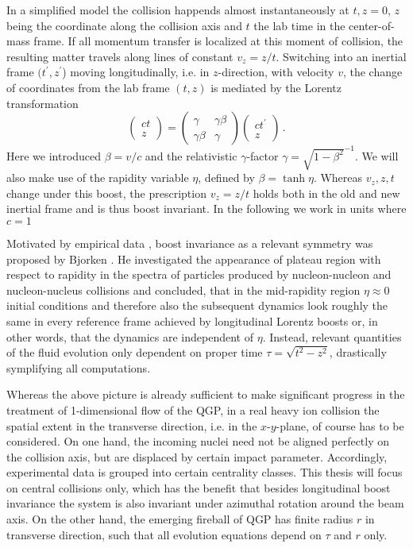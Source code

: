 In a simplified model \cite{Ollitrault_2008} the collision happends almost instantaneously at ${t,z=0}$, $z$ being the coordinate along the collision axis and $t$ the lab time in the center-of-mass frame. If all momentum transfer is localized at this moment of collision, the resulting matter travels along lines of constant ${v_z=z/t}$. Switching into an inertial frame $(t^\prime,z^\prime$) moving longitudinally, i.e. in $z$-direction, with velocity $v$, the change of coordinates from the lab frame $(t,z)$ is mediated by the Lorentz transformation
\begin{equation}
    \begin{pmatrix}
        ct\\z
    \end{pmatrix}
    =
    \begin{pmatrix}
        \gamma&\gamma\beta\\
        \gamma\beta &\gamma
    \end{pmatrix}
    \begin{pmatrix}
        ct^\prime\\
        z
    \end{pmatrix}\,.
\end{equation}
Here we introduced ${\beta=v/c}$ and the relativistic $\gamma$-factor ${\gamma=\sqrt{1-\beta^2}^{-1}}$. We will also make use of the rapidity variable $\eta$, defined by ${\beta=\tanh\eta}$. Whereas ${v_z,z,t}$ change under this boost, the prescription ${v_z=z/t}$ holds both in the old and new inertial frame and is thus boost invariant. In the following we work in units where ${c=1}$

Motivated by empirical data \cite{AlpgardEtAl_1981}, boost invariance as a relevant symmetry was proposed by Bjorken \cite{Bjorken_1983}. He investigated the appearance of plateau region with respect to rapidity in the spectra of particles produced by nucleon-nucleon and nucleon-nucleus collisions and concluded, that in the mid-rapidity region ${\eta\approx 0}$ initial conditions and therefore also the subsequent dynamics look roughly the same in every reference frame achieved by longitudinal Lorentz boosts or, in other words, that the dynamics are independent of $\eta$. Instead, relevant quantities of the fluid evolution only dependent on proper time ${\tau=\sqrt{t^2-z^2}}$, drastically symplifying all computations.

Whereas the above picture is already sufficient to make significant progress in the treatment of 1-dimensional flow of the QGP, in a real heavy ion collision the spatial extent in the transverse direction, i.e. in the $x$-$y$-plane, of course has to be considered. On one hand, the incoming nuclei need not be aligned perfectly on the collision axis, but are displaced by certain impact parameter. Accordingly, experimental data is grouped into certain centrality classes. This thesis will focus on central collisions only, which has the benefit that besides longitudinal boost invariance the system is also invariant under azimuthal rotation around the beam axis. On the other hand, the emerging fireball of QGP has finite radius $r$ in transverse direction, such that all evolution equations depend on $\tau$ and $r$ only.

